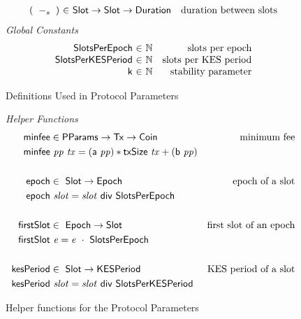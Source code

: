 \begin{figure*}[htb]
\begin{equation*}
    \begin{array}{r@{~\in~}lr}
      (\slotminus{}{}) & \Slot \to \Slot \to \Duration
                       & \text{duration between slots}
    \end{array}
  \end{equation*}
  \emph{Global Constants}
  \begin{equation*}
    \begin{array}{r@{~\in~}lr}
      \SlotsPerEpoch & \N & \text{slots per epoch} \\
      \SlotsPerKESPeriod & \N & \text{slots per KES period} \\
      \SlotsStabilityParam & \N & \text{stability parameter}
    \end{array}
  \end{equation*}
  \caption{Definitions Used in Protocol Parameters}
  \label{fig:defs:protocol-parameters}
\end{figure*}

\begin{figure*}[htb]
  \emph{Helper Functions}
  \begin{align*}
    \mathsf{minfee} & \in \mathsf{PParams} \to \mathsf{Tx} \to \mathsf{Coin} & \text{minimum fee}\\
    \mathsf{minfee} & ~\mathit{pp}~\mathit{tx} =
    (\mathsf{a}~\mathit{pp}) * \mathsf{txSize}~\mathit{tx} + (\mathsf{b}~\mathit{pp})
    \\
    \\
    \mathsf{epoch} & \in ~ \mathsf{Slot} \to \mathsf{Epoch} & \text{epoch of a slot}
    \\
    \mathsf{epoch} & ~\mathit{slot} = \mathit{slot}~\mathsf{div}~\mathsf{SlotsPerEpoch}
    \\
    \\
    \mathsf{firstSlot} & \in ~ \mathsf{Epoch} \to \mathsf{Slot}
               & \text{first slot of an epoch}
    \\
    \mathsf{firstSlot} & ~\mathit{e} = \mathit{e}~\cdot~\mathsf{SlotsPerEpoch}
    \\
    \\
    \mathsf{kesPeriod} & \in ~ \mathsf{Slot} \to \mathsf{KESPeriod} & \text{KES period of a slot}
    \\
    \mathsf{kesPeriod} & ~\mathit{slot} = \mathit{slot}~\mathsf{div}~\mathsf{SlotsPerKESPeriod}
  \end{align*}
  \caption{Helper functions for the Protocol Parameters}
  \label{fig:defs:protocol-parameters-helpers}
\end{figure*}

\clearpage
